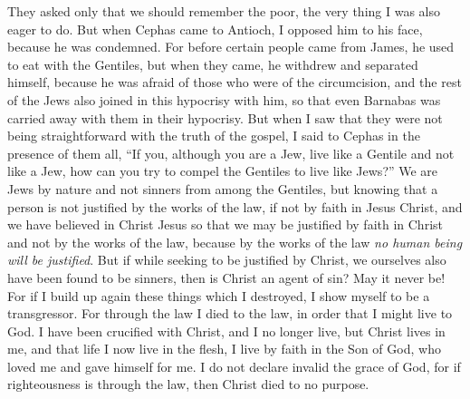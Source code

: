\begin{biblechapter}
\verse They asked only that we should remember the poor, the very thing I was also eager to do.
 But when Cephas came to Antioch, I opposed him to his face, because he was condemned.
\verse For before certain people came from James, he used to eat with the Gentiles, but when they came, he withdrew and separated himself, because he was afraid of those who were of the circumcision,
\verse and the rest of the Jews also joined in this hypocrisy with him, so that even Barnabas was carried away with them in their hypocrisy.
\verse But when I saw that they were not being straightforward with the truth of the gospel, I said to Cephas in the presence of them all, “If you, although you are a Jew, live like a Gentile and not like a Jew, how can you try to compel the Gentiles to live like Jews?”
 We are Jews by nature and not sinners from among the Gentiles,
\verse but knowing that a person is not justified by the works of the law, if not by faith in Jesus Christ, and we have believed in Christ Jesus so that we may be justified by faith in Christ and not by the works of the law, because by the works of the law \textit{no human being will be justified}.
\verse But if while seeking to be justified by Christ, we ourselves also have been found to be sinners, then is Christ an agent of sin? May it never be!
\verse For if I build up again these things which I destroyed, I show myself to be a transgressor.
\verse For through the law I died to the law, in order that I might live to God. I have been crucified with Christ,
\verse and I no longer live, but Christ lives in me, and that life I now live in the flesh, I live by faith in the Son of God, who loved me and gave himself for me.
\verse I do not declare invalid the grace of God, for if righteousness is through the law, then Christ died to no purpose.
\end{biblechapter}

